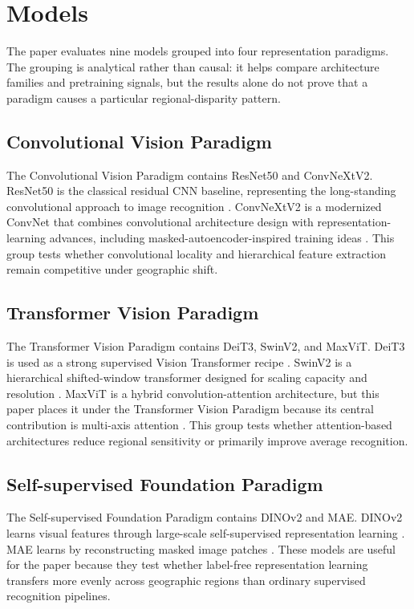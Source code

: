 \section{Models}

The paper evaluates nine models grouped into four representation paradigms. The grouping is analytical rather than causal: it helps compare architecture families and pretraining signals, but the results alone do not prove that a paradigm causes a particular regional-disparity pattern.

\subsection{Convolutional Vision Paradigm}

The Convolutional Vision Paradigm contains ResNet50 and ConvNeXtV2. ResNet50 is the classical residual CNN baseline, representing the long-standing convolutional approach to image recognition \citep{he2016resnet}. ConvNeXtV2 is a modernized ConvNet that combines convolutional architecture design with representation-learning advances, including masked-autoencoder-inspired training ideas \citep{woo2023convnextv2}. This group tests whether convolutional locality and hierarchical feature extraction remain competitive under geographic shift.

\subsection{Transformer Vision Paradigm}

The Transformer Vision Paradigm contains DeiT3, SwinV2, and MaxViT. DeiT3 is used as a strong supervised Vision Transformer recipe \citep{touvron2022deit3}. SwinV2 is a hierarchical shifted-window transformer designed for scaling capacity and resolution \citep{liu2022swinv2}. MaxViT is a hybrid convolution-attention architecture, but this paper places it under the Transformer Vision Paradigm because its central contribution is multi-axis attention \citep{tu2022maxvit}. This group tests whether attention-based architectures reduce regional sensitivity or primarily improve average recognition.

\subsection{Self-supervised Foundation Paradigm}

The Self-supervised Foundation Paradigm contains DINOv2 and MAE. DINOv2 learns visual features through large-scale self-supervised representation learning \citep{oquab2024dinov2}. MAE learns by reconstructing masked image patches \citep{he2022mae}. These models are useful for the paper because they test whether label-free representation learning transfers more evenly across geographic regions than ordinary supervised recognition pipelines.

